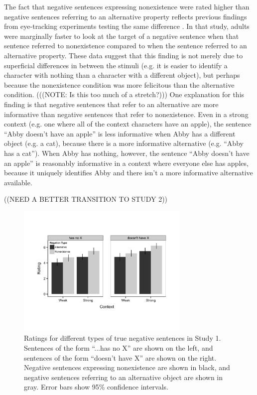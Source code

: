 \documentclass[10pt,letterpaper]{article}
\begin{document}
The fact that negative sentences expressing nonexistence were rated higher than negative sentences referring to an alternative property reflects previous findings from eye-tracking experiments testing the same difference \cite{nordmeyer2014}.  In that study, adults were marginally faster to look at the target of a negative sentence when that sentence referred to nonexistence compared to when the sentence referred to an alternative property.  These data suggest that this finding is not merely due to superficial differences in between the stimuli (e.g. it is easier to identify a character with nothing than a character with a different object), but perhaps because the nonexistence condition was more felicitous than the alternative condition.  (((NOTE: Is this too much of a stretch?))) One explanation for this finding is that negative sentences that refer to an alternative are more informative than negative sentences that refer to nonexistence.  Even in a strong context (e.g. one where all of the context characters have an apple), the sentence ``Abby doesn't have an apple'' is less informative when Abby has a different object (e.g. a cat), because there is a more informative alternative (e.g. ``Abby has a cat'').  When Abby has nothing, however, the sentence ``Abby doesn't have an apple'' is reasonably informative in a context where everyone else has apples, because it uniquely identifies Abby and there isn't a more informative alternative available.  

((NEED A BETTER TRANSITION TO STUDY 2))


\begin{figure}
\begin{center} 
\includegraphics[width=3.25in]{figures/study1.pdf}
\caption{\label{fig:s1} Ratings for different types of true negative sentences in Study 1.  Sentences of the form ``...has no X'' are shown on the left, and sentences of the form ``doesn't have X'' are shown on the right.  Negative sentences expressing nonexistence are shown in black, and negative sentences referring to an alternative object are shown in gray.  Error bars show 95\% confidence intervals.}
\end{center} 
\end{figure}
\end{document}
